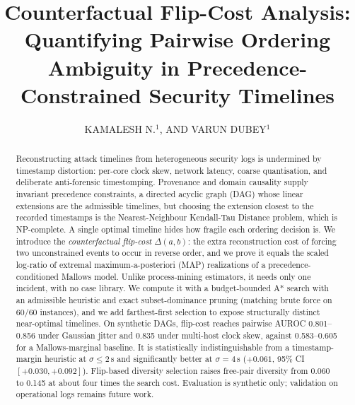\documentclass{ieeeaccess}
\begin{document}
\history{}

\title{Counterfactual Flip-Cost Analysis: Quantifying Pairwise Ordering Ambiguity in Precedence-Constrained Security Timelines}

\author{KAMALESH N.$^{1}$, AND VARUN DUBEY$^{1}$}

\address[1]{School of Computer Science and Engineering, Vellore Institute of Technology, Chennai Campus, Chennai 600127, Tamil Nadu, India (e-mail: kamalesh.n2024@vitstudent.ac.in, varun.dubey2024@vitstudent.ac.in)}


\begin{abstract}
Reconstructing attack timelines from heterogeneous security logs is undermined by timestamp distortion: per-core clock skew, network latency, coarse quantisation, and deliberate anti-forensic timestomping. Provenance and domain causality supply invariant precedence constraints, a directed acyclic graph (DAG) whose linear extensions are the admissible timelines, but choosing the extension closest to the recorded timestamps is the Nearest-Neighbour Kendall-Tau Distance problem, which is NP-complete. A single optimal timeline hides how fragile each ordering decision is. We introduce the \emph{counterfactual flip-cost} $\Delta(a,b)$: the extra reconstruction cost of forcing two unconstrained events to occur in reverse order, and we prove it equals the scaled log-ratio of extremal maximum-a-posteriori (MAP) realizations of a precedence-conditioned Mallows model. Unlike process-mining estimators, it needs only one incident, with no case library. We compute it with a budget-bounded A* search with an admissible heuristic and exact subset-dominance pruning (matching brute force on 60/60 instances), and we add farthest-first selection to expose structurally distinct near-optimal timelines. On synthetic DAGs, flip-cost reaches pairwise AUROC 0.801--0.856 under Gaussian jitter and 0.835 under multi-host clock skew, against 0.583--0.605 for a Mallows-marginal baseline. It is statistically indistinguishable from a timestamp-margin heuristic at $\sigma\le2$\,s and significantly better at $\sigma=4$\,s ($+0.061$, 95\% CI $[+0.030,+0.092]$). Flip-based diversity selection raises free-pair diversity from 0.060 to 0.145 at about four times the search cost. Evaluation is synthetic only; validation on operational logs remains future work.
\end{abstract}
\end{document}
